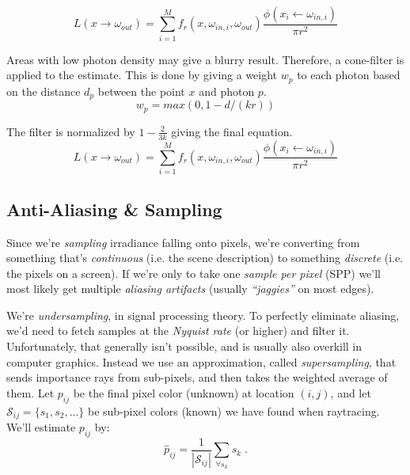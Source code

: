 \documentclass[a4paper, twocolumn]{article}
\begin{document}
            \begin{equation*}
              L(x \rightarrow \omega_{out}) = \sum_{i=1}^M f_r(x, \omega_{in,i}, \omega_{out}) \frac{\phi(x_i \leftarrow \omega_{in,i})}{\pi r^2}
            \end{equation*}

            Areas with low photon density may give a blurry result. Therefore, a cone-filter is applied to the estimate. This is done by giving a weight $w_p$ to each photon based on the distance $d_p$ between the point $x$ and photon $p$. 
            \begin{equation*}
              w_p = max(0, 1 - d/(kr))
            \end{equation*}

            The filter is normalized by $1 - \tfrac{2}{3k}$ giving the final equation.
            \begin{equation*}
         L(x \rightarrow \omega_{out}) = \sum_{i=1}^M f_r(x, \omega_{in,i}, \omega_{out}) \frac{\phi(x_i \leftarrow \omega_{in,i}) }{\pi r^2}
            \end{equation*}

        \subsection{Anti-Aliasing \& Sampling} \label{sec:anti-aliasing_and_sampling}

            Since we're \emph{sampling} irradiance falling onto pixels, we're converting from something that's \emph{continuous} (i.e. the scene description) to something \emph{discrete} (i.e. the pixels on a screen). If we're only to take one \emph{sample per pixel} (SPP) we'll most likely get multiple \emph{aliasing artifacts} (usually \emph{``jaggies''} on most edges).

            We're \emph{undersampling}, in signal processing theory. To perfectly eliminate aliasing, we'd need to fetch samples at the \emph{Nyquist rate} (or higher) and filter it. Unfortunately, that generally isn't possible, and is usually also overkill in computer graphics. Instead we use an approximation, called \emph{supersampling}, that sends importance rays from sub-pixels, and then takes the weighted average of them. Let \(p_{ij}\) be the final pixel color (unknown) at location \((i,j)\), and let \(\mathcal{S}_{ij} = \{s_1, s_2, ...\}\) be sub-pixel colors (known) we have found when raytracing. We'll estimate \(p_{ij}\) by: \[\hat{p}_{ij} = \frac{1}{|\mathcal{S}_{ij}|}\sum_{\forall s_k } s_k \; .\]
\end{document}
